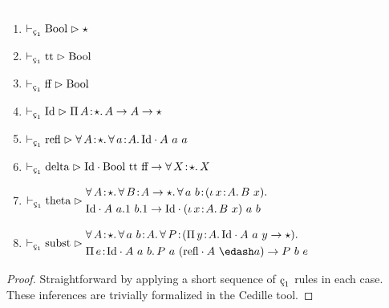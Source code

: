 \begin{lemma}
    \label{lem:4:c1_stuff}
    \textcolor{white}{\_}
    \begin{enumerate}
        \item $\vdash_{\oldced} \cBool \infr \star$
        \item $\vdash_{\oldced} \ctt \infr \cBool$
        \item $\vdash_{\oldced} \cff \infr \cBool$
        \item $\vdash_{\oldced} \cId \infr \abs{\Pi}{A}{\star}{A \to A \to \star}$
        \item {
            $
                \vdash_{\oldced} \crefl \infr \abs{\forall}{A}{\star}{
                    \abs{\forall}{a}{A}{
                        \cId \cdot A\ a\ a
                    }
                }
            $
        }
        \item $\vdash_{\oldced} \cdelta \infr \cId \cdot \cBool\ \ctt\ \cff \to \abs{\forall}{X}{\star}{X}$
        \item {
            $\vdash_{\oldced} \ctheta \infr
            \begin{aligned}
                 &\abs{\forall}{A}{\star}{
                    \abs{\forall}{B}{A \to \star}{
                        \abs{\forall}{a\ b}{(\abs{\iota}{x}{A}{B\ x})}{
                            \\ &\cId \cdot A\ a.1\ b.1 \to \cId \cdot (\abs{\iota}{x}{A}{B\ x})\ a\ b
                        }
                    }
                }
            \end{aligned}
            $
        }
        \item {
            $\vdash_{\oldced} \csubst \infr 
            \begin{aligned}
                &\abs{\forall}{A}{\star}{
                    \abs{\forall}{a\ b}{A}{
                        \abs{\forall}{P}{ (\abs{\Pi}{y}{A}{\cId \cdot A\ a\ y \to \star}) }{
                            \\ &\abs{\Pi}{e}{\cId \cdot A\ a\ b}{
                                P\ a\ (\crefl \cdot A\ \edash a) \to P\ b\ e
                            }
                        }
                    }
                }
            \end{aligned}
            $
        }
    \end{enumerate}
\end{lemma}
\begin{proof}
    Straightforward by applying a short sequence of $\oldced$ rules in each case.
    These inferences are trivially formalized in the Cedille tool.
\end{proof}

